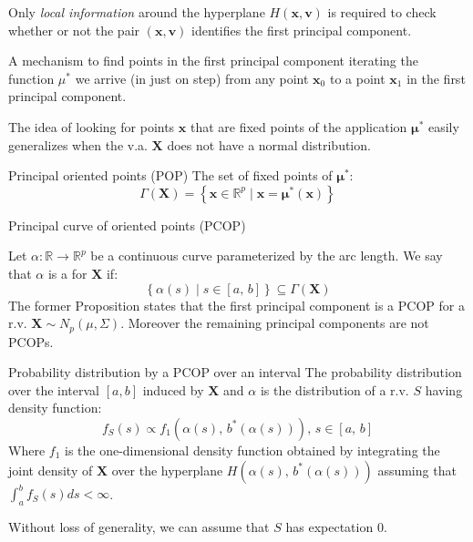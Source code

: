 Only \emph{local information} around the hyperplane $H(\boldsymbol x, \boldsymbol v)$ is required
to check whether or not the pair $(\boldsymbol x, \boldsymbol v)$ identifies the first principal
component.

A mechanism to find points in the first principal component iterating the function
$\mu^*$ we arrive (in just on step) from any point
$\boldsymbol x_0$ to a point $\boldsymbol x_1$ in the first principal component.

The idea of looking for points $\boldsymbol x$ that are fixed points of the application
$\boldsymbol \mu^*$ easily generalizes when the v.a. $\boldsymbol X$ does not have a normal
distribution.

\begin{definition}{Principal oriented points (POP)}{}
	The set of fixed points of $\boldsymbol \mu^*$:
	\begin{equation*}
		\Gamma(\boldsymbol X) = \left\{
		\boldsymbol x \in \mathds{R}^p \mid \boldsymbol x = \boldsymbol \mu^*(\boldsymbol x)
		\right\}
	\end{equation*}
\end{definition}

\begin{definition}{Principal curve of oriented points (PCOP)}{}

	Let $\alpha : \mathds{R} \to \mathds{R}^p$ be a continuous curve parameterized by the arc length.
	We say that $\alpha$ is a  for $\boldsymbol X$ if:
	\begin{equation*}
		\left\{
		\alpha(s) \mid s \in [a,\, b]
		\right\} \subseteq \Gamma(\boldsymbol X)
	\end{equation*}
	\tcblower
	The former Proposition states that the first principal component is a PCOP
	for a r.v. $\boldsymbol X \sim N_p(\mu, \Sigma)$. Moreover the remaining principal
	components are not PCOPs.
\end{definition}

\begin{definition}{Probability distribution by a PCOP over an interval}{}
	The probability distribution over the interval $[a, b]$ induced by $\boldsymbol X$ and $\alpha$
	is the distribution of a r.v. $S$ having density function:
	\begin{equation*}
		f_S(s) \propto f_1(\alpha(s),\, b^*(\alpha(s))),\,s\in[a,\, b]
	\end{equation*}
	\tcblower
	Where $f_1$ is the one-dimensional density function obtained by integrating
	the joint density of $\boldsymbol X$ over the hyperplane $H(\alpha(s),\, b^*(\alpha(s)))$
	assuming that $\int_a^b f_S(s) ds < \infty$.

	Without loss of generality, we can assume that $S$ has expectation 0.
\end{definition}


